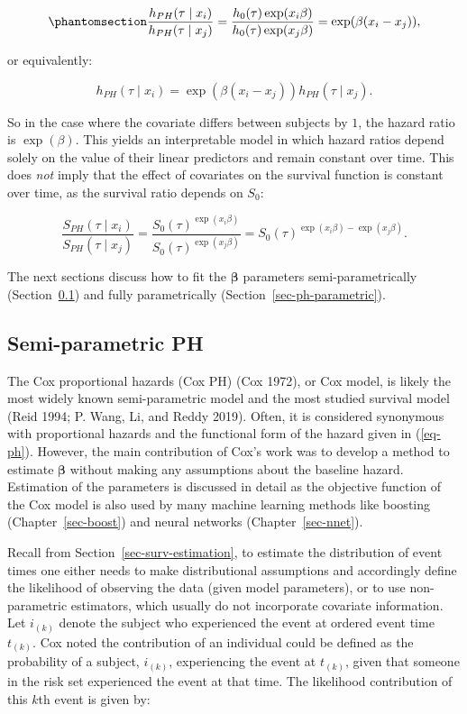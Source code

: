 \documentclass[
  letterpaper,
  krantz2]{style/krantz}
\begin{document}
\begin{equation}\phantomsection\label{eq-ph-hazard-ratio}{
\frac{h_{PH}(\tau \mid x_i)}{h_{PH}(\tau \mid x_j)} = \frac{h_0(\tau)\exp(x_i\beta)}{h_0(\tau)\exp(x_j\beta)} = \exp(\beta(x_i -x_j)),
}\end{equation}

or equivalently:

\[
h_{PH}(\tau \mid x_i) = \exp(\beta(x_i - x_j))h_{PH}(\tau \mid x_j).
\]

So in the case where the covariate differs between subjects by \(1\),
the hazard ratio is \(\exp(\beta)\). This yields an interpretable model
in which hazard ratios depend solely on the value of their linear
predictors and remain constant over time. This does \emph{not} imply
that the effect of covariates on the survival function is constant over
time, as the survival ratio depends on \(S_0\):

\[
\frac{S_{PH}(\tau \mid x_i)}{S_{PH}(\tau \mid x_j)} = \frac{S_0(\tau)^{\exp(x_i\beta)}}{S_0(\tau)^{\exp(x_j\beta)}} = S_0(\tau)^{\exp(x_i\beta)-\exp(x_j\beta)}.
\]

The next sections discuss how to fit the \(\boldsymbol{\beta}\)
parameters semi-parametrically (Section~\ref{sec-ph-semi-parametric})
and fully parametrically (Section~\ref{sec-ph-parametric}).

\subsection{Semi-parametric PH}\label{sec-ph-semi-parametric}

The Cox proportional hazards (Cox PH) (Cox 1972), or Cox model, is
likely the most widely known semi-parametric model and the most studied
survival model (Reid 1994; P. Wang, Li, and Reddy
2019).
Often, it is considered synonymous with proportional hazards and the
functional form of the hazard given in (\ref{eq-ph}). However, the main
contribution of Cox's work was to develop a method to estimate
\(\boldsymbol{\beta}\) without making any assumptions about the baseline
hazard.  Estimation of the parameters is
discussed in detail as the objective function of the Cox model is also
used by many machine learning methods like boosting
(Chapter~\ref{sec-boost}) and neural networks (Chapter~\ref{sec-nnet}).

Recall from Section~\ref{sec-surv-estimation}, to estimate the
distribution of event times one either needs to make distributional
assumptions and accordingly define the likelihood of observing the data
(given model parameters), or to use non-parametric estimators, which
usually do not incorporate covariate information. Let \(i_{(k)}\) denote
the subject who experienced the event at ordered event time \(t_{(k)}\).
Cox noted the contribution of an individual could be defined as the
probability of a subject, \(i_{(k)}\), experiencing the event at
\(t_{(k)}\), given that someone in the risk set experienced the event at
that time. The likelihood contribution of this \(k\)th event is given
by:
\end{document}

